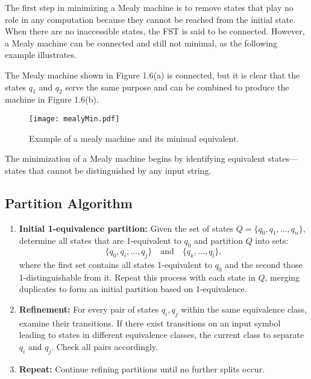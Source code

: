 The first step in minimizing a Mealy machine is to remove states that play no role in any computation 
because they cannot be reached from the initial state. When there are no inaccessible states, 
the FST is said to be connected. However, a Mealy machine can be connected and still not minimal, as the following example illustrates.

The Mealy machine shown in Figure 1.6(a) is connected, but it is clear that the states \( q_1 \) and \( q_2 \) 
serve the same purpose and can be combined to produce the machine in Figure 1.6(b).


\begin{figure}[htbp]
    \centering
    \texttt{[image: mealyMin.pdf]}
    \caption{Example of a mealy machine and its minimal equivalent.}
    \label{fig:6}
\end{figure}

The minimization of a Mealy machine begins by identifying equivalent states—states that cannot be distinguished by any input string.\cite{linz2011formal}

\subsection*{Partition Algorithm}

\begin{enumerate}
    \item \textbf{Initial 1-equivalence partition:}  
    Given the set of states \(Q = \{q_0, q_1, \ldots, q_n\}\), determine all states that are 1-equivalent to \(q_0\) and partition \(Q\) into sets:
    \[
    \{q_0, q_i, \ldots, q_j\} \quad \text{and} \quad \{q_k, \ldots, q_l\},
    \]
    where the first set contains all states 1-equivalent to \(q_0\) and the second those 1-distinguishable from it. 
    Repeat this process with each state in \(Q\), merging duplicates to form an initial partition based on 1-equivalence.
    
    \item \textbf{Refinement:}  
    For every pair of states \(q_i, q_j\) within the same equivalence class, examine their transitions. 
    If there exist transitions on an input symbol leading to states in different equivalence classes, 
    the current class to separate \(q_i\) and \(q_j\). Check all pairs accordingly.
    
    \item \textbf{Repeat:}  
    Continue refining partitions until no further splits occur.
\end{enumerate}


